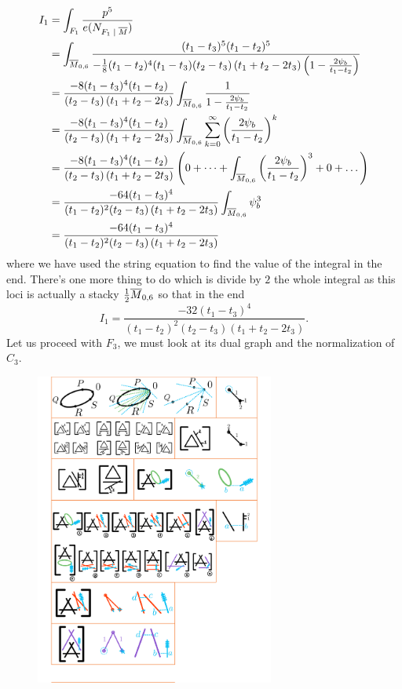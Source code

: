 \documentclass[12pt]{memoir}
\begin{document}
\begin{Ex}
\begin{align*}
        I_1&=\int_{F_1}\frac{p^5}{e(N_{F_1\mid\ov M})}\\
        &=\int_{\ov M_{0,6}}\frac{(t_1-t_3)^5(t_1-t_2)^5}{-\frac{1}{8}(t_1-t_2)^4(t_1-t_3)(t_2-t_3)\left(t_1+t_2-2t_3\right)\left(1-\frac{2\psi_b}{t_1-t_2}\right)}\\
        &=\frac{-8(t_1-t_3)^4(t_1-t_2)}{(t_2-t_3)\left(t_1+t_2-2t_3\right)}\int_{\ov M_{0,6}}\frac{1}{1-\frac{2\psi_b}{t_1-t_2}}\\
        &=\frac{-8(t_1-t_3)^4(t_1-t_2)}{(t_2-t_3)\left(t_1+t_2-2t_3\right)}\int_{\ov M_{0,6}}\sum_{k=0}^{\infty}\left(\frac{2\psi_b}{t_1-t_2}\right)^k\\
        &=\frac{-8(t_1-t_3)^4(t_1-t_2)}{(t_2-t_3)\left(t_1+t_2-2t_3\right)}\left(0+\dots+\int_{\ov M_{0,6}}\left(\frac{2\psi_b}{t_1-t_2}\right)^3+0+\dots\right)\\
        &=\frac{-64(t_1-t_3)^4}{(t_1-t_2)^2(t_2-t_3)\left(t_1+t_2-2t_3\right)}\int_{\ov M_{0,6}}\psi_b^3\\
        &=\frac{-64(t_1-t_3)^4}{(t_1-t_2)^2(t_2-t_3)\left(t_1+t_2-2t_3\right)}
    \end{align*}
    where we have used the string equation to find the value of the integral in the end. There's one more thing to do which is divide by $2$ the whole integral as this loci is actually a stacky $\half\ov{M}_{0,6}$ so that in the end
    $$I_1=\frac{-32(t_1-t_3)^4}{(t_1-t_2)^2(t_2-t_3)\left(t_1+t_2-2t_3\right)}.$$
    Let us proceed with $F_3$, we must look at its dual graph and the normalization of $C_3$. 
    \begin{figure}[h!]
        \centering
        \includegraphics[width=0.7\textwidth, trim= 1.32cm 5.5cm 9cm 19.5cm,clip]{../figs/FigsDNnotability3.pdf}

\end{figure}
\end{Ex}
\end{document}
